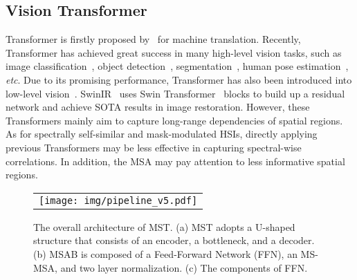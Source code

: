 \documentclass[10pt,twocolumn,letterpaper]{article}
\begin{document}
\subsection{Vision Transformer}
Transformer is firstly proposed by~\cite{vaswani2017attention} for machine translation. Recently, Transformer has achieved great success in many high-level vision tasks, such as image classification~\cite{liu2021swin,arnab2021vivit,global_msa,xcit}, object detection~\cite{de_detr,to_1,DETR,dy_detr}, segmentation~\cite{tc_3,cao2021swin,SETR}, human pose estimation~\cite{tokenpose,transpose,rsn,prtr},  \emph{etc}. Due to its promising performance, Transformer has also been introduced into low-level vision~\cite{ipt,swinir,vsrt,uformer,pngan,fgst,rformer}.  SwinIR~\cite{swinir} uses Swin Transformer~\cite{swinir} blocks to build up a residual network and achieve SOTA results in image restoration. However, these Transformers mainly aim to capture long-range dependencies of spatial regions. As for spectrally self-similar and mask-modulated HSIs, directly applying previous Transformers may be less effective in capturing spectral-wise correlations. In addition, the MSA may pay attention to  less informative spatial regions.


\begin{figure*}[t]
	\begin{center}
		\begin{tabular}[t]{c} \hspace{-3.4mm}
			\texttt{[image: img/pipeline\_v5.pdf]}
		\end{tabular}
	\end{center}
	\vspace*{-6mm}
	\caption{\small The overall architecture of MST. (a) MST adopts a U-shaped structure that consists of an encoder, a bottleneck, and a decoder. (b) MSAB is composed of a Feed-Forward Network (FFN), an MS-MSA, and two layer normalization. (c) The components of FFN.}
	\label{fig:pipeline}
	\vspace{-4mm}
\end{figure*}

\vspace{-0.3mm}
\end{document}
